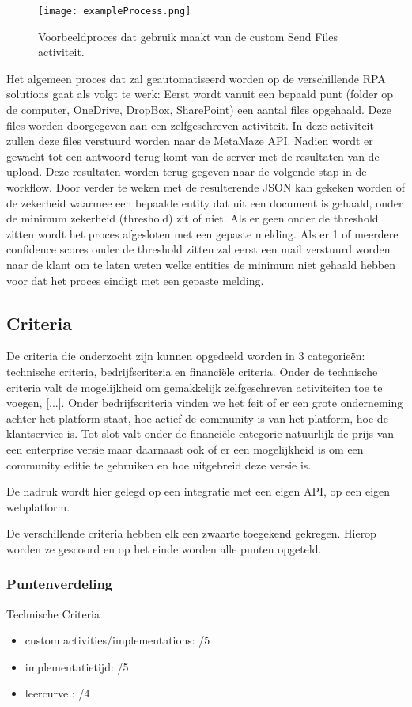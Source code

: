 \begin{figure}[h]
	\texttt{[image: exampleProcess.png]}
	\caption{Voorbeeldproces dat gebruik maakt van de custom Send Files activiteit.}
\end{figure}

Het algemeen proces dat zal geautomatiseerd worden op de verschillende RPA solutions gaat als volgt te werk: Eerst wordt vanuit een bepaald punt (folder op de computer, OneDrive, DropBox, SharePoint) een aantal files opgehaald. Deze files worden doorgegeven aan een zelfgeschreven activiteit. In deze activiteit zullen deze files verstuurd worden naar de MetaMaze API. Nadien wordt er gewacht tot een antwoord terug komt van de server met de resultaten van de upload. Deze resultaten worden terug gegeven naar de volgende stap in de workflow. Door verder te weken met de resulterende JSON kan gekeken worden of de zekerheid waarmee een bepaalde entity dat uit een document is gehaald, onder de minimum zekerheid (threshold) zit of niet. Als er geen onder de threshold zitten wordt het proces afgesloten met een gepaste melding. Als er 1 of meerdere confidence scores onder de threshold zitten zal eerst een mail verstuurd worden naar de klant om te laten weten welke entities de minimum niet gehaald hebben voor dat het proces eindigt met een gepaste melding.

\subsection{Criteria}
De criteria die onderzocht zijn kunnen opgedeeld worden in 3 categorieën: technische criteria, bedrijfscriteria en financiële criteria. Onder de technische criteria valt de mogelijkheid om gemakkelijk zelfgeschreven activiteiten toe te voegen, [...]. Onder bedrijfscriteria vinden we het feit of er een grote onderneming achter het platform staat, hoe actief de community is van het platform, hoe de klantservice is. Tot slot valt onder de financiële categorie natuurlijk de prijs van een enterprise versie maar daarnaast ook of er een mogelijkheid is om een community editie te gebruiken en hoe uitgebreid deze versie is.

De nadruk wordt hier gelegd op een integratie met een eigen API, op een eigen webplatform.

De verschillende criteria hebben elk een zwaarte toegekend gekregen. Hierop worden ze gescoord en op het einde worden alle punten opgeteld.

\subsubsection{Puntenverdeling}
Technische Criteria
\begin{itemize}
	\item custom activities/implementations: /5
	\item implementatietijd: /5
	\item leercurve : /4
\end{itemize}

